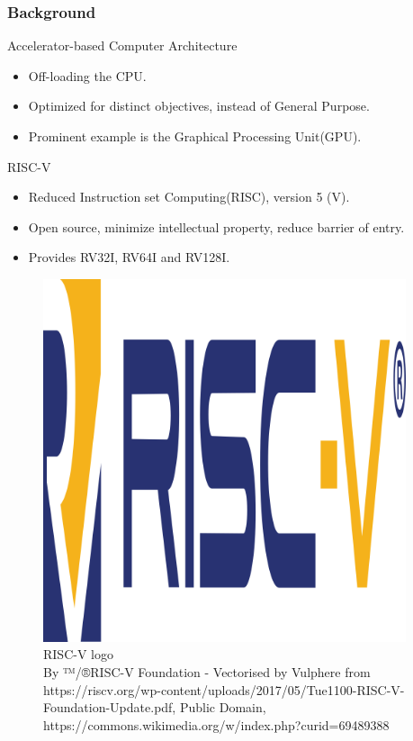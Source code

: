 
\begin{frame}[hoved]
  \frametitle{Background}
  \begin{minipage}{0.45\textwidth}
  {\large Accelerator-based Computer Architecture}
  \begin{itemize}
    \item Off-loading the CPU.
    \item Optimized for distinct objectives, instead of General Purpose.
    \item Prominent example is the Graphical Processing Unit(GPU).
  \end{itemize}
  \vspace{0.5em}
  {\large RISC-V}
  \begin{itemize}
    \item Reduced Instruction set Computing(RISC), version 5 (V).
    \item Open source, minimize intellectual property, reduce barrier of entry.
    \item Provides RV32I, RV64I and RV128I.
  \end{itemize}
\end{minipage}
\hfill
\begin{minipage}{0.45\textwidth}
  \begin{figure}
    \begin{center}
      \includegraphics[width=0.95\textwidth]{figures/RISC-V-logo.png}
    \end{center}
    \caption{RISC-V logo \\ \tiny By ™/®RISC-V Foundation - Vectorised by
    Vulphere from
  https://riscv.org/wp-content/uploads/2017/05/Tue1100-RISC-V-Foundation-Update.pdf,
Public Domain,
https://commons.wikimedia.org/w/index.php?curid=69489388}\label{fig:riscv}
  \end{figure}
\end{minipage}
\end{frame}

